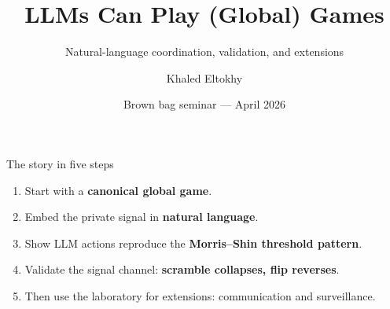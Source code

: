 \documentclass[aspectratio=169,12pt]{beamer}
\title{LLMs Can Play (Global) Games}
\subtitle{Natural-language coordination, validation, and extensions}
\author{Khaled Eltokhy}
\institute{CUNY Graduate Center, Department of Economics}
\date{Brown bag seminar --- April 2026}
\newcommand{\hl}[1]{{\color{accent}\textbf{#1}}}
\begin{document}
\begin{frame}[plain]
  \vspace{1.0cm}
  {\color{purple}\inserttitle\par}
  \vspace{0.35cm}
  {\color{muted}\insertsubtitle\par}

  \vfill
  {\large\color{purple}\insertauthor}\par
  {\color{muted}\insertinstitute}\par
  {\color{muted}\insertdate}\par
\end{frame}

\begin{frame}{The story in five steps}
  \large
  \begin{enumerate}\setlength\itemsep{0.45em}
    \item Start with a \hl{canonical global game}.
    \item Embed the private signal in \hl{natural language}.
    \item Show LLM actions reproduce the \hl{Morris--Shin threshold pattern}.
    \item Validate the signal channel: \hl{scramble collapses, flip reverses}.
    \item Then use the laboratory for extensions: communication and surveillance.
  \end{enumerate}
\end{frame}
\end{document}
